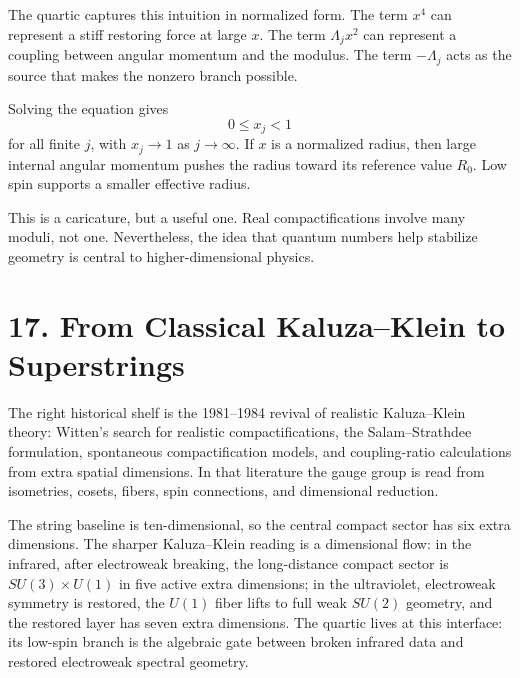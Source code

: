\documentclass[11pt]{article}
\newcommand{\Lspin}{\Lambda_j}
\begin{document}
The quartic captures this intuition in normalized form. The term \(x^4\) can represent a stiff restoring force at large \(x\). The term \(\Lspin x^2\) can represent a coupling between angular momentum and the modulus. The term \(-\Lspin\) acts as the source that makes the nonzero branch possible.

Solving the equation gives
\[
        0\leq x_j<1
\]
for all finite \(j\), with \(x_j\to 1\) as \(j\to\infty\). If \(x\) is a normalized radius, then large internal angular momentum pushes the radius toward its reference value \(R_0\). Low spin supports a smaller effective radius.

This is a caricature, but a useful one. Real compactifications involve many moduli, not one. Nevertheless, the idea that quantum numbers help stabilize geometry is central to higher-dimensional physics.


\section*{17. From Classical Kaluza--Klein to Superstrings}

The right historical shelf is the 1981--1984 revival of realistic Kaluza--Klein theory: Witten's search for realistic compactifications, the Salam--Strathdee formulation, spontaneous compactification models, and coupling-ratio calculations from extra spatial dimensions. In that literature the gauge group is read from isometries, cosets, fibers, spin connections, and dimensional reduction.

The string baseline is ten-dimensional, so the central compact sector has six extra dimensions. The sharper Kaluza--Klein reading is a dimensional flow: in the infrared, after electroweak breaking, the long-distance compact sector is \(SU(3)\times U(1)\) in five active extra dimensions; in the ultraviolet, electroweak symmetry is restored, the \(U(1)\) fiber lifts to full weak \(SU(2)\) geometry, and the restored layer has seven extra dimensions. The quartic lives at this interface: its low-spin branch is the algebraic gate between broken infrared data and restored electroweak spectral geometry.
\end{document}
